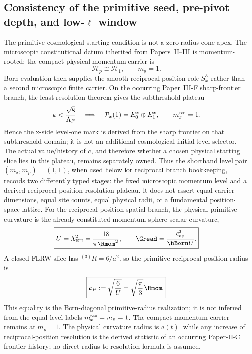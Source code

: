 \documentclass[12pt,a4paper]{article}
\begin{document}
\subsection{Consistency of the primitive seed, pre-pivot depth, and low-\texorpdfstring{$\ell$}{ell} window}
\label{p8:sec:exact-match}

The primitive cosmological starting condition is not a zero-radius cone apex.  The microscopic constitutional datum inherited from Papers~II--III is momentum-rooted: the compact physical momentum carrier is
\[
\mathcal H_p\cong\mathcal H_1,
\qquad
m_p=1.
\]
Born evaluation then supplies the smooth reciprocal-position role $S_x^3$ rather than a second microscopic finite carrier.  On the occurring Paper~III-F sharp-frontier branch, the least-resolution theorem gives the subthreshold plateau
\[
 a<\frac{\sqrt8}{\Lambda_F}
 \quad\Longrightarrow\quad
 \mathcal P_x(1)=E_0^x\oplus E_1^x,
 \qquad m_x^{\rm res}=1.
\]
Hence the x-side level-one mark is derived from the sharp frontier on that
subthreshold domain; it is not an additional cosmological initial-level
selector.  The actual value/history of $a$, and therefore whether a chosen
physical starting slice lies in this plateau, remains separately owned.
Thus the shorthand level pair $(m_x,m_p)=(1,1)$, when used below for reciprocal branch bookkeeping, records two differently typed stages: the fixed microscopic momentum level and a derived reciprocal-position resolution plateau.  It does not assert equal carrier dimensions, equal site counts, equal physical radii, or a fundamental position-space lattice.
For the reciprocal-position spatial branch, the physical primitive curvature is the already constituted momentum-sphere scalar curvature,
\[
 \boxed{U=\Lambda_{\rm EH}^2=\frac{18}{\pi\Rmom^2},\qquad
 \Gread=\frac{c_{\rm op}^3}{\hBorn U}.}
\]
A closed FLRW slice has \({}^{(3)}R=6/a^2\), so the primitive reciprocal-position radius is
\begin{equation}
\label{p8:eq:primitive-spatial-radius}
 \boxed{a_P:=\sqrt{\frac6U}=\sqrt{\frac\pi3}\,\Rmom.}
\end{equation}
This equality is the Born-diagonal primitive-radius realization; it is not inferred from the equal level labels \(m_x^{\rm res}=m_p=1\).  The compact momentum carrier remains at \(m_p=1\).  The physical curvature radius is \(a(t)\), while any increase of reciprocal-position resolution is the derived statistic of an occurring Paper-II-C frontier history; no direct radius-to-resolution formula is assumed.
\end{document}

